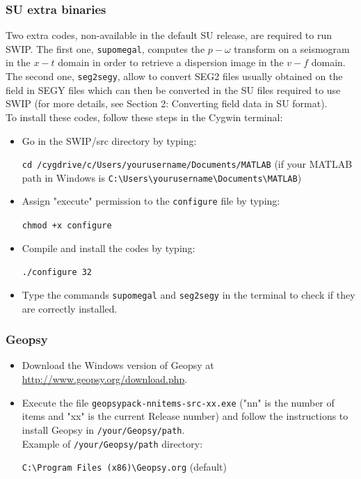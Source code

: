 \documentclass[twoside,a4paper]{article}
\begin{document}
\subsubsection{SU extra binaries}
Two extra codes, non-available in the default SU release, are required to run SWIP. The first one, \verb|supomegal|, computes the $p-\omega$ transform on a seismogram in the $x-t$ domain in order to retrieve a dispersion image in the $v-f$ domain. The second one, \verb|seg2segy|, allow to convert SEG2 files usually obtained on the field in SEGY files which can then be converted in the SU files required to use SWIP (for more details, see Section 2: Converting field data in SU format).\\[1ex]
To install these codes, follow these steps in the Cygwin terminal:
\begin{itemize}
\setlength\itemsep{2ex}
\setlength{\parindent}{5ex}
\item Go in the SWIP/src directory by typing:

\verb|cd /cygdrive/c/Users/yourusername/Documents/MATLAB| (if your MATLAB path in Windows is \verb|C:\Users\yourusername\Documents\MATLAB|)

\item Assign "execute" permission to the \verb|configure| file by typing:

\verb|chmod +x configure|

\item Compile and install the codes by typing:

\verb|./configure 32|

\item Type the commands \verb|supomegal| and \verb|seg2segy| in the terminal to check if they are correctly installed.

\end{itemize}

\subsubsection{Geopsy}
\begin{itemize}
\setlength\itemsep{2ex}
\setlength{\parindent}{5ex}
\item Download the Windows version of Geopsy at \url{http://www.geopsy.org/download.php}.

\item Execute the file \verb|geopsypack-nnitems-src-xx.exe| ("nn" is the number of items and "xx" is the current Release number) and follow the instructions to install Geopsy in \verb|/your/Geopsy/path|.\\[1ex]
Example of \verb|/your/Geopsy/path| directory:

\verb|C:\Program Files (x86)\Geopsy.org| (default)

\end{itemize}
\end{document}
